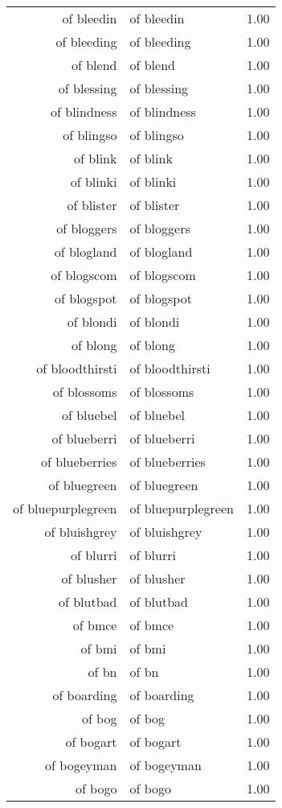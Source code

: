 \begin{table}[ht]
\begin{tabular}{rlr}
  of bleedin & of bleedin & 1.00 \\ 
  of bleeding & of bleeding & 1.00 \\ 
  of blend & of blend & 1.00 \\ 
  of blessing & of blessing & 1.00 \\ 
  of blindness & of blindness & 1.00 \\ 
  of blingso & of blingso & 1.00 \\ 
  of blink & of blink & 1.00 \\ 
  of blinki & of blinki & 1.00 \\ 
  of blister & of blister & 1.00 \\ 
  of bloggers & of bloggers & 1.00 \\ 
  of blogland & of blogland & 1.00 \\ 
  of blogscom & of blogscom & 1.00 \\ 
  of blogspot & of blogspot & 1.00 \\ 
  of blondi & of blondi & 1.00 \\ 
  of blong & of blong & 1.00 \\ 
  of bloodthirsti & of bloodthirsti & 1.00 \\ 
  of blossoms & of blossoms & 1.00 \\ 
  of bluebel & of bluebel & 1.00 \\ 
  of blueberri & of blueberri & 1.00 \\ 
  of blueberries & of blueberries & 1.00 \\ 
  of bluegreen & of bluegreen & 1.00 \\ 
  of bluepurplegreen & of bluepurplegreen & 1.00 \\ 
  of bluishgrey & of bluishgrey & 1.00 \\ 
  of blurri & of blurri & 1.00 \\ 
  of blusher & of blusher & 1.00 \\ 
  of blutbad & of blutbad & 1.00 \\ 
  of bmce & of bmce & 1.00 \\ 
  of bmi & of bmi & 1.00 \\ 
  of bn & of bn & 1.00 \\ 
  of boarding & of boarding & 1.00 \\ 
  of bog & of bog & 1.00 \\ 
  of bogart & of bogart & 1.00 \\ 
  of bogeyman & of bogeyman & 1.00 \\ 
  of bogo & of bogo & 1.00 \\ 

\end{tabular}
\end{table}
